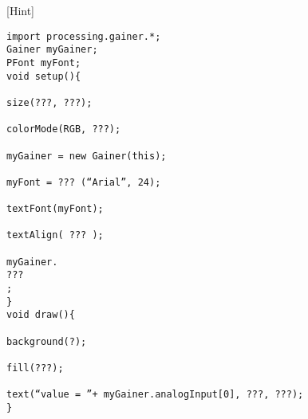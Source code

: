 \documentclass[11pt,a4paper]{jarticle}
\begin{document}
[Hint]
\begin{lstlisting}
import processing.gainer.*;
Gainer myGainer;
PFont myFont;
void setup(){
	
size(???, ???);
	
colorMode(RGB, ???);
	
myGainer = new Gainer(this);
	
myFont = ??? (“Arial”, 24);
	
textFont(myFont);
	
textAlign( ??? );
	
myGainer.
???
;
}
void draw(){
	
background(?);
	
fill(???);
	
text(“value = ”+ myGainer.analogInput[0], ???, ???);
}
 
\end{lstlisting}
\end{document}
